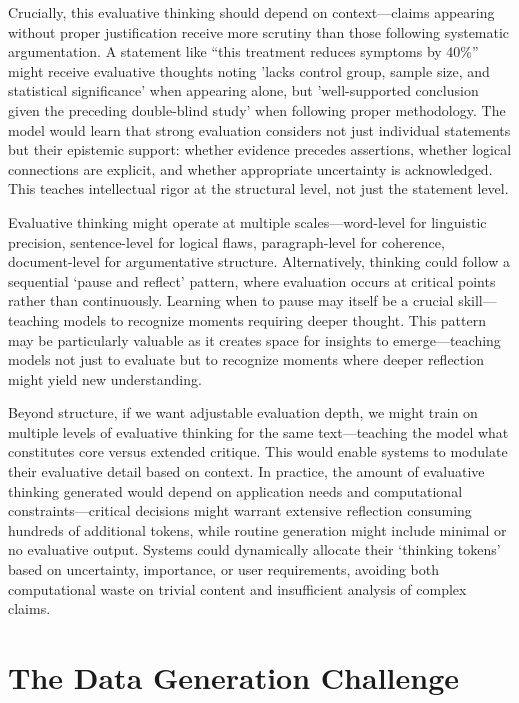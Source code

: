 \documentclass[11pt]{article}
\begin{document}
	Crucially, this evaluative thinking should depend on context---claims appearing without proper justification receive more scrutiny than those following systematic argumentation. A statement like ``this treatment reduces symptoms by 40\%'' might receive evaluative thoughts noting 'lacks control group, sample size, and statistical significance' when appearing alone, but 'well-supported conclusion given the preceding double-blind study' when following proper methodology. The model would learn that strong evaluation considers not just individual statements but their epistemic support: whether evidence precedes assertions, whether logical connections are explicit, and whether appropriate uncertainty is acknowledged. This teaches intellectual rigor at the structural level, not just the statement level.
	
	Evaluative thinking might operate at multiple scales---word-level for linguistic precision, sentence-level for logical flaws, paragraph-level for coherence, document-level for argumentative structure. Alternatively, thinking could follow a sequential `pause and reflect' pattern, where evaluation occurs at critical points rather than continuously. Learning when to pause may itself be a crucial skill---teaching models to recognize moments requiring deeper thought. This pattern may be particularly valuable as it creates space for insights to emerge---teaching models not just to evaluate but to recognize moments where deeper reflection might yield new understanding.
	
	Beyond structure, if we want adjustable evaluation depth, we might train on multiple levels of evaluative thinking for the same text---teaching the model what constitutes core versus extended critique. This would enable systems to modulate their evaluative detail based on context. In practice, the amount of evaluative thinking generated would depend on application needs and computational constraints---critical decisions might warrant extensive reflection consuming hundreds of additional tokens, while routine generation might include minimal or no evaluative output. Systems could dynamically allocate their `thinking tokens' based on uncertainty, importance, or user requirements, avoiding both computational waste on trivial content and insufficient analysis of complex claims.
	
	\section{The Data Generation Challenge}
	
\end{document}

